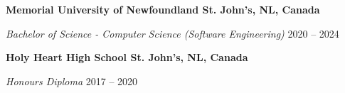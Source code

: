 \textbf{Memorial University of Newfoundland \hfill St. John's, NL, Canada} \par
\textit{Bachelor of Science - Computer Science (Software Engineering)} \hfill 2020 -- 2024\par
\textbf{Holy Heart High School \hfill St. John's, NL, Canada} \par
\textit{Honours Diploma} \hfill 2017 -- 2020\par
